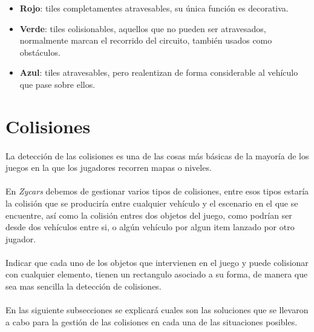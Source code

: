 \begin{itemize}
    \item \textbf{Rojo}: tiles completamentes atravesables, su única función es decorativa.
    
    \item \textbf{Verde}: tiles colisionables, aquellos que no pueden ser atravesados, normalmente marcan el recorrido
    del circuito, también usados como obstáculos.
    
    \item \textbf{Azul}: tiles atravesables, pero realentizan de forma considerable al vehículo que pase sobre ellos.
\end{itemize}

\section{Colisiones}

\paragraph{}
La detección de las colisiones es una de las cosas más básicas de la mayoría de los juegos en la que los jugadores
recorren mapas o niveles.

\paragraph{}
En \emph{Zycars} debemos de gestionar varios tipos de colisiones, entre esos tipos estaría la colisión que se produciría 
entre cualquier vehículo y el escenario en el que se encuentre, así como la colisión entres dos objetos del juego, como podrían
ser desde dos vehículos entre si, o algún vehículo por algun item lanzado por otro jugador.

\paragraph{}
Indicar que cada uno de los objetos que intervienen en el juego y puede colisionar con cualquier elemento, tienen
un rectangulo asociado a su forma, de manera que sea mas sencilla la detección de colisiones.

\paragraph{}
En las siguiente subsecciones se explicará cuales son las soluciones que se llevaron a cabo para la gestión de las colisiones 
en cada una de las situaciones posibles.

